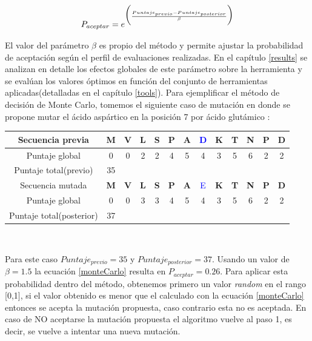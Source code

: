 \begin{enumerate}
 {
    \begin{equation}\label{monteCarlo}
    \Large
    P_{aceptar} =  e^{\Big(\frac{Puntaje_{previo}  - Puntaje_{posterior} } {\beta}\Big)} 
   \end{equation}
  }
    
    El valor del parámetro $\beta$ es propio del método y permite ajustar la probabilidad de aceptación según el perfil de evaluaciones realizadas. 
    En el capítulo \ref{results} se analizan en detalle los efectos globales de este parámetro sobre la herramienta y se evalúan los valores óptimos en función del conjunto de herramientas aplicadas(detalladas en el capítulo \ref{tools}).
    Para ejemplificar el método de decisión de Monte Carlo, tomemos el siguiente caso de mutación en donde se propone mutar el ácido aspártico en la posición 7 por ácido glutámico :
    
      \vspace{0.3cm}
      \begin{center}
       \begin{tabular}{ccccccccccccc}\hline
	Secuencia previa &  \textbf{M} & \textbf{V} & \textbf{L} & \textbf{S} & \textbf{P} & \textbf{A} & \textcolor{blue}{D} & \textbf{K} & \textbf{T} & \textbf{N} & \textbf{P} & \textbf{D} \\ \hline
	Puntaje global & 0 & 0 & 2 & 2 & 4 & 5 & 4 & 3 & 5 & 6 & 2 & 2\\  \hline
       Puntaje total(previo) & 35 \\ \hline \hline 
       Secuencia mutada  &  \textbf{M} & \textbf{V} & \textbf{L} & \textbf{S} & \textbf{P} & \textbf{A} & \textcolor{blue}{E}& \textbf{K} & \textbf{T} & \textbf{N} & \textbf{P} & \textbf{D}\\  \hline
	Puntaje global & 0 & 0 & 3 & 3 & 4 & 5 & 4 & 3 & 5 & 6 & 2 & 2\\  \hline
       Puntaje total(posterior) & 37 \\ \hline
      \end{tabular}\\
    \end{center}
    
    Para este caso $Puntaje_{previo}=35$ y $Puntaje_{posterior}=37$. Usando un valor de $\beta=1.5$ la ecuación \ref{monteCarlo} resulta en $P_{aceptar} = 0.26$.
    Para aplicar esta probabilidad dentro del método, obtenemos primero un valor \textit{random} en el rango [0,1], si el valor obtenido es menor que el calculado con la ecuación \ref{monteCarlo} entonces se acepta la mutación propuesta, 
    caso contrario esta no es aceptada. 
    En caso de NO aceptarse la mutación propuesta el algoritmo vuelve al paso 1, es decir, se vuelve a intentar una nueva mutación. 
        
\end{enumerate} 



